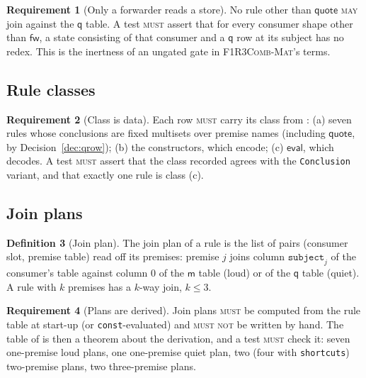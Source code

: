 \documentclass[11pt,a4paper]{article}
\newcommand{\code}[1]{\texttt{#1}}
\newcommand{\Mat}{\textsc{F1R3Comb-Mat}}
\newcommand{\MUST}{\textsc{must}}
\newcommand{\MUSTNOT}{\textsc{must not}}
\newcommand{\MAY}{\textsc{may}}
\newcommand{\mm}{\mathsf{m}}
\newcommand{\fw}{\mathsf{fw}}
\newcommand{\qq}{\mathsf{q}}
\theoremstyle{definition}
\newtheorem{definition}{Definition}[section]
\newtheorem{requirement}[definition]{Requirement}
\theoremstyle{plain}
\begin{document}
\begin{requirement}[Only a forwarder reads a store]\label{req:quietjoin}
No rule other than $\mathsf{quote}$ \MAY{} join against the $\qq$ table. A
test \MUST{} assert that for every consumer shape other than $\fw$, a state
consisting of that consumer and a $\qq$ row at its subject has no redex. This
is the inertness of an ungated gate \cite[Lem.~6.5]{draft3} in \Mat's terms.
\end{requirement}

\subsection{Rule classes}

\begin{requirement}[Class is data]\label{req:class}
Each row \MUST{} carry its class from \cite[\S5.1]{matnote}: (a) seven rules
whose conclusions are fixed multisets over premise names (including
$\mathsf{quote}$, by Decision~\ref{dec:qrow}); (b) the constructors, which
encode; (c) $\mathsf{eval}$, which decodes. A test \MUST{} assert that the
class recorded agrees with the \code{Conclusion} variant, and that exactly
one rule is class (c).
\end{requirement}

\subsection{Join plans}

\begin{definition}[Join plan]\label{def:plan}
The join plan of a rule is the list of pairs (consumer slot, premise table)
read off its premises: premise $j$ joins column $\code{subject}_{j}$ of the
consumer's table against column 0 of the $\mm$ table (loud) or of the $\qq$
table (quiet). A rule with $k$ premises has a $k$-way join, $k \le 3$.
\end{definition}

\begin{requirement}[Plans are derived]\label{req:plansderived}
Join plans \MUST{} be computed from the rule table at start-up (or
\code{const}-evaluated) and \MUSTNOT{} be written by hand. The table of
\cite[\S7.1]{matnote} is then a theorem about the derivation, and a test
\MUST{} check it: seven one-premise loud plans, one one-premise quiet plan,
two (four with \code{shortcuts}) two-premise plans, two three-premise plans.
\end{requirement}
\end{document}
